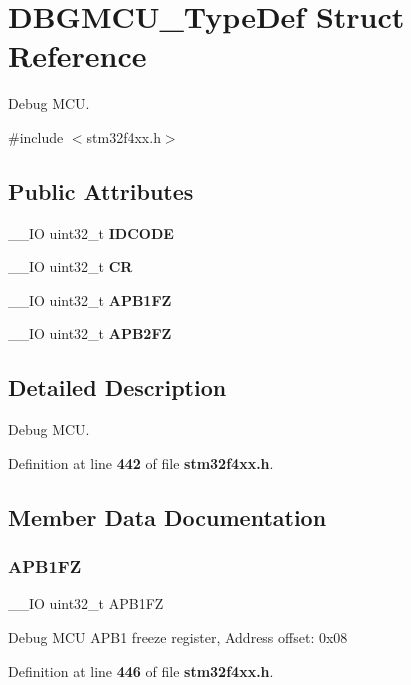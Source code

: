 \section{D\+B\+G\+M\+C\+U\+\_\+\+Type\+Def Struct Reference}
\label{structDBGMCU__TypeDef}


Debug M\+CU.  




{\ttfamily \#include $<$stm32f4xx.\+h$>$}

\subsection*{Public Attributes}
\begin{DoxyCompactItemize}
\item 
\+\_\+\+\_\+\+IO uint32\+\_\+t \textbf{ I\+D\+C\+O\+DE}
\item 
\+\_\+\+\_\+\+IO uint32\+\_\+t \textbf{ CR}
\item 
\+\_\+\+\_\+\+IO uint32\+\_\+t \textbf{ A\+P\+B1\+FZ}
\item 
\+\_\+\+\_\+\+IO uint32\+\_\+t \textbf{ A\+P\+B2\+FZ}
\end{DoxyCompactItemize}


\subsection{Detailed Description}
Debug M\+CU. 

Definition at line \textbf{ 442} of file \textbf{ stm32f4xx.\+h}.



\subsection{Member Data Documentation}
\mbox{\label{structDBGMCU__TypeDef_a5eaefc557573ae7bdc632ef6b6d574b5}} 
\subsubsection{A\+P\+B1\+FZ}
{\footnotesize\ttfamily \+\_\+\+\_\+\+IO uint32\+\_\+t A\+P\+B1\+FZ}

Debug M\+CU A\+P\+B1 freeze register, Address offset\+: 0x08 

Definition at line \textbf{ 446} of file \textbf{ stm32f4xx.\+h}.

